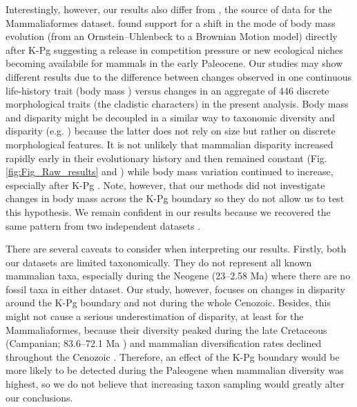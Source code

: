 \documentclass[12pt,letterpaper]{article}
\begin{document}
Interestingly, however, our results also differ from \cite{Slater2012MEE}, the source of data for the Mammaliaformes dataset.
\cite{Slater2012MEE} found support for a shift in the mode of body mass evolution (from an Ornstein--Uhlenbeck to a Brownian Motion model) directly after K-Pg suggesting a release in competition pressure or new ecological niches becoming availabile for mammals in the early Paleocene.
Our studies may show different results due to the difference between changes observed in one continuous life-history trait (body mass \cite{Slater2012MEE}) versus changes in an aggregate of 446 discrete morphological traits (the cladistic characters) in the present analysis.
Body mass and disparity might be decoupled in a similar way to taxonomic diversity and disparity (e.g. \cite{slaterCetacean,ruta2013,hopkinsdecoupling2013}) because the latter does not rely on size but rather on discrete morphological features.
It is not unlikely that mammalian disparity increased rapidly early in their evolutionary history and then remained constant (Fig. \ref{fig:Fig_Raw_results} and \cite{Close2015,Lee2015R759}) while body mass variation continued to increase, especially after K-Pg \cite{Slater2012MEE}.
Note, however, that our methods did not investigate changes in body mass across the K-Pg boundary so they do not allow us to test this hypothesis.
We remain confident in our results because we recovered the same pattern from two independent datasets \cite{Slater2012MEE,beckancient2014}.

There are several caveats to consider when interpreting our results. 
Firstly, both our datasets are limited taxonomically.
They do not represent all known mammalian taxa, especially during the Neogene (23--2.58 Ma) where there are no fossil taxa in either dataset.
Our study, however, focuses on changes in disparity around the K-Pg boundary and not during the whole Cenozoic.
Besides, this might not cause a serious underestimation of disparity, at least for the Mammaliaformes, because their diversity peaked during the late Cretaceous (Campanian; 83.6--72.1 Ma \cite{Newham201432}) and mammalian diversification rates declined throughout the Cenozoic \cite{Raia2012}.
Therefore, an effect of the K-Pg boundary would be more likely to be detected during the Paleogene when mammalian diversity was highest, so we do not believe that increasing taxon sampling would greatly alter our conclusions.
\end{document}
